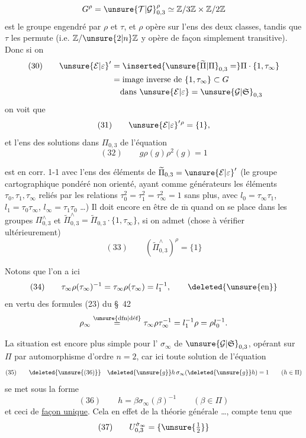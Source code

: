 \[
G^\rho=\unsure{\mathcal T|\mathcal G}_{0,3}^{\rho}
\simeq\mathbb Z/3\mathbb Z\times\mathbb Z/2\mathbb Z
\]
est le groupe engendré par $\rho$ et $\tau$, et $\rho$ opère  sur l'ens des deux classes, tandis que $\tau$ les permute (i.e. $\mathbb Z/\unsure{2|n}\mathbb Z$  y opère de façon simplement transitive).
Donc si on 
\[
\begin{aligned}
(30)\qquad\unsure{\mathcal E|\varepsilon}'
&=\inserted{\unsure{\widetilde\Pi|\Pi}_{0,3}=}\Pi\cdot\{1,\tau_\infty\}\\
&=\text{image inverse de }\{1,\tau_\infty\}\subset G\\
&\phantom{={}}\text{dans }\unsure{\mathcal E|\varepsilon}=\unsure{\mathcal G|\mathfrak S}_{0,3}
\end{aligned}
\]
on voit que
\[
(31)\qquad\unsure{\mathcal E|\varepsilon}'{}^\rho=\{1\},
\]
et l'ens des solutions dans \uline{$\Pi_{0,3}$} de l'équation
\[
(32)\qquad g\rho(g)\rho^2(g)=1
\]


est en corr. 1-1 avec l'ens des éléments de $\widetilde\Pi_{0,3}=\unsure{\mathcal E|\varepsilon}'$ (le groupe cartographique  pondéré non orienté, ayant comme générateurs les éléments $\tau_0,\tau_1,\tau_\infty$ reliés par les relations $\tau_0^2=\tau_1^2=\tau_\infty^2=1$ sans plus, avec $l_0=\tau_\infty\tau_1$, $l_1=\tau_0\tau_\infty$, $l_\infty=\tau_1\tau_0$ \dots)
Il doit encore en être de $\overline{\mathrm m}$ quand on se place dans les groupes $\Pi_{0,3}^{\wedge}$ et $\widetilde\Pi_{0,3}^{\wedge}=\widetilde\Pi_{0,3}\cdot\{1,\tau_\infty\}$, si on admet (chose à vérifier ultérieurement)
\[
(33)\qquad(\widetilde\Pi_{0,3}^{\wedge})^\rho=\{1\}
\]

Notons que l'on a ici
\[
(34)\qquad\tau_\infty\rho(\tau_\infty)^{-1}
=\tau_\infty\rho(\tau_\infty)=l_1^{-1},
\qquad\deleted{\unsure{\text{en}}}
\]
en vertu des formules (23) du \S\ 42
\[
\rho_\infty\overset{\unsure{\mathrm{dfn}|\text{déf}}}{=}
\tau_\infty\rho\tau_\infty^{-1}
=l_1^{-1}\rho=\rho l_0^{-1}.
\]

La situation est encore plus simple pour l' $\sigma_\infty$ de $\unsure{\mathcal G|\mathfrak S}_{0,3}$, opérant sur $\Pi$ par automorphisme d'ordre $n=2$, car ici toute solution de l'équation 
\[
(35)\qquad\deleted{\unsure{(36)}}\quad
\deleted{\unsure{g}}h\,\sigma_\infty(\deleted{\unsure{g}}h)=1
\qquad(h\in\Pi)
\]
se met sous la forme 
\[
(36)\qquad h=\beta\sigma_\infty(\beta)^{-1}
\qquad(\beta\in\Pi)
\]
et ceci de \uline{façon unique}. Cela  en effet de la théorie générale \dots, compte tenu que
\[
(37)\qquad U_{0,3}^{\dot\sigma_\infty}=\{\unsure{\tfrac12}\}
\]
